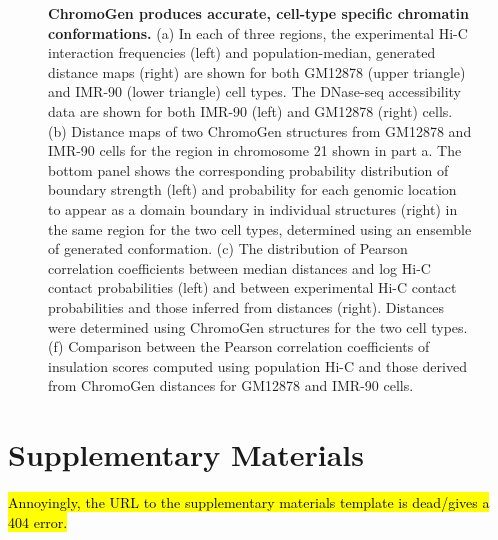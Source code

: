\documentclass[12pt,letterpaper]{article}
\begin{document}
\begin{figure}[H]
    \centering
    \caption{
    \textbf{ChromoGen produces accurate, cell-type specific chromatin conformations.}
    (a)
    In each of three regions, the experimental Hi-C interaction frequencies (left) and population-median, generated distance maps (right) are shown for both GM12878 (upper triangle) and IMR-90 (lower triangle) cell types. 
    The DNase-seq accessibility data are shown for both IMR-90 (left) and GM12878 (right) cells.
    (b) Distance maps of two ChromoGen structures from GM12878 and IMR-90 cells for the region in chromosome 21 shown in part a. The bottom panel shows the corresponding  probability distribution of boundary strength (left) and  probability for each genomic location to appear as a domain boundary in individual structures (right) in the same region for the two cell types, determined using an ensemble of generated conformation. 
    (c) 
    The distribution of Pearson correlation coefficients between median distances and log Hi-C contact probabilities (left) and between experimental Hi-C contact probabilities and those inferred from distances (right). Distances were determined using ChromoGen structures for the two cell types. 
    (f) Comparison between the Pearson correlation coefficients of insulation scores computed using population Hi-C and those derived from ChromoGen distances for GM12878 and IMR-90 cells. 
    }
    \label{fig:transferability}
\end{figure}

\section*{Supplementary Materials}

\hl{Annoyingly, the URL to the supplementary materials template is dead/gives a 404 error.}
\end{document}
